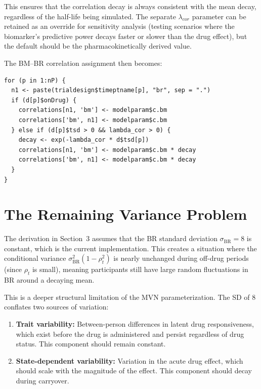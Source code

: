 \documentclass[11pt]{article}
\begin{document}
This ensures that the correlation decay is always consistent
with the mean decay, regardless of the half-life being
simulated. The separate $\lambda_{cor}$ parameter can be
retained as an override for sensitivity analysis (testing
scenarios where the biomarker's predictive power decays
faster or slower than the drug effect), but the default
should be the pharmacokinetically derived value.

The BM--BR correlation assignment then becomes:

\begin{verbatim}
for (p in 1:nP) {
  n1 <- paste(trialdesign$timeptname[p], "br", sep = ".")
  if (d[p]$onDrug) {
    correlations[n1, 'bm'] <- modelparam$c.bm
    correlations['bm', n1] <- modelparam$c.bm
  } else if (d[p]$tsd > 0 && lambda_cor > 0) {
    decay <- exp(-lambda_cor * d$tsd[p])
    correlations[n1, 'bm'] <- modelparam$c.bm * decay
    correlations['bm', n1] <- modelparam$c.bm * decay
  }
}
\end{verbatim}

\section{The Remaining Variance Problem}

The derivation in Section~3 assumes that the BR standard
deviation $\sigma_{\text{BR}} = 8$ is constant, which is
the current implementation. This creates a situation where
the conditional variance
$\sigma_{\text{BR}}^2 (1 - \rho_t^2)$ is nearly unchanged
during off-drug periods (since $\rho_t$ is small), meaning
participants still have large random fluctuations in BR
around a decaying mean.

This is a deeper structural limitation of the MVN
parameterization. The SD of 8 conflates two sources of
variation:

\begin{enumerate}
\item \textbf{Trait variability:} Between-person differences
  in latent drug responsiveness, which exist before the drug
  is administered and persist regardless of drug status. This
  component should remain constant.

\item \textbf{State-dependent variability:} Variation in
  the acute drug effect, which should scale with the
  magnitude of the effect. This component should decay during
  carryover.
\end{enumerate}
\end{document}
